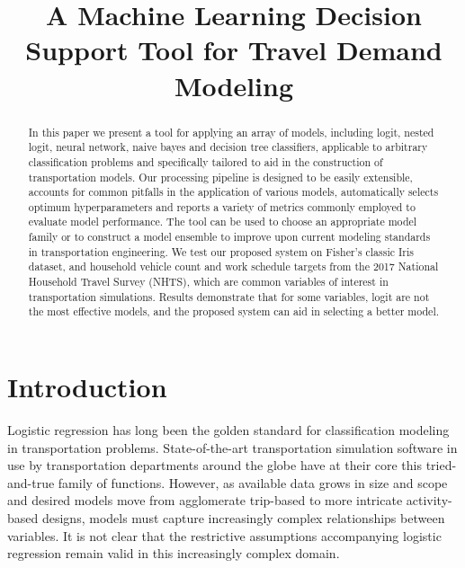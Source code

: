 \documentclass[conference]{IEEEtran}
\begin{document}
\title{A Machine Learning Decision Support Tool for Travel Demand Modeling}

\author{
\and
{}
\and
{}
}


\maketitle

\begin{abstract}
In this paper we present a tool for applying an array of models, including logit, nested logit, neural network, naive bayes and decision tree classifiers, applicable to arbitrary classification problems and specifically tailored to aid in the construction of transportation models.
 Our processing pipeline is designed to be easily extensible, accounts for common pitfalls in the application of various models, automatically selects optimum hyperparameters and reports a variety of metrics commonly employed to evaluate model performance. 
 The tool can be used to choose an appropriate model family or to construct a model ensemble to improve upon current modeling standards in transportation engineering.
 We test our proposed system on Fisher's classic Iris dataset, and household vehicle count and work schedule targets from the 2017 National Household Travel Survey (NHTS), which are common variables of interest in transportation simulations.
 Results demonstrate that for some variables, logit are not the most effective models, and the proposed system can aid in selecting a better model.
\end{abstract}

\section{Introduction}\label{section:introduction}
Logistic regression has long been the golden standard for classification modeling in transportation problems.
 State-of-the-art transportation simulation software \cite{horni2016multi, sheppard2017modeling} in use by transportation departments around the globe have at their core this tried-and-true family of functions.
 However, as available data grows in size and scope and desired models move from agglomerate trip-based to more intricate activity-based designs, models must capture increasingly complex relationships between variables.
 It is not clear that the restrictive assumptions accompanying logistic regression remain valid in this increasingly complex domain.
 
\end{document}
